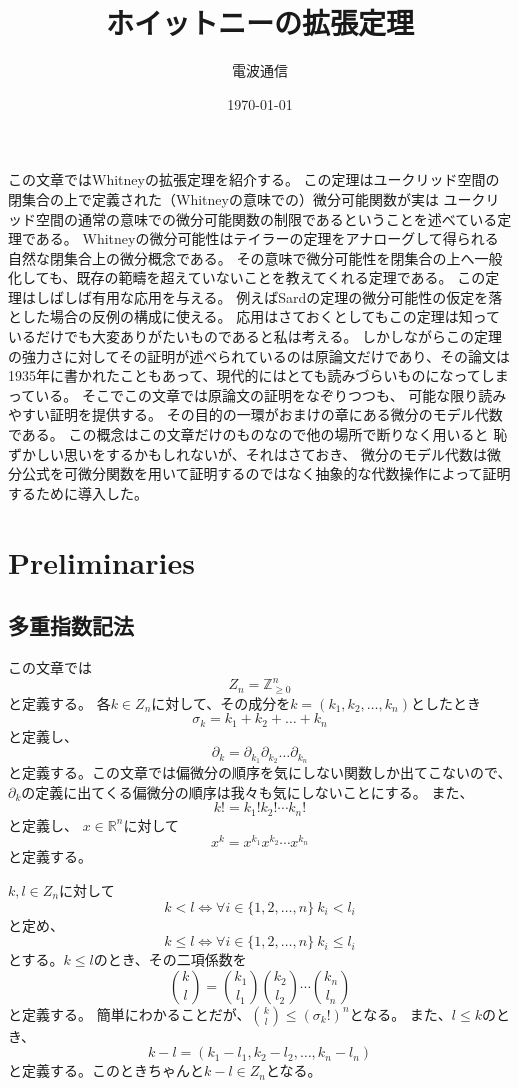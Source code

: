 \documentclass[leqno]{jsarticle}
\title{ホイットニーの拡張定理}
\author{電波通信}
\date{\today}
\newcommand{\zz}{\mathbb{Z}}
\newcommand{\rr}{\mathbb{R}}
\begin{document}
\maketitle
この文章ではWhitneyの拡張定理を紹介する。
この定理はユークリッド空間の閉集合の上で定義された（Whitneyの意味での）微分可能関数が実は
ユークリッド空間の通常の意味での微分可能関数の制限であるということを述べている定理である。
Whitneyの微分可能性はテイラーの定理をアナローグして得られる自然な閉集合上の微分概念である。
その意味で微分可能性を閉集合の上へ一般化しても、既存の範疇を超えていないことを教えてくれる定理である。
この定理はしばしば有用な応用を与える。
例えばSardの定理の微分可能性の仮定を落とした場合の反例の構成に使える。
応用はさておくとしてもこの定理は知っているだけでも大変ありがたいものであると私は考える。
しかしながらこの定理の強力さに対してその証明が述べられているのは原論文だけであり、その論文は1935年に書かれたこともあって、現代的にはとても読みづらいものになってしまっている。
そこでこの文章では原論文の証明をなぞりつつも、
可能な限り読みやすい証明を提供する。
その目的の一環がおまけの章にある微分のモデル代数である。
この概念はこの文章だけのものなので他の場所で断りなく用いると
恥ずかしい思いをするかもしれないが、それはさておき、
微分のモデル代数は微分公式を可微分関数を用いて証明するのではなく抽象的な代数操作によって証明するために導入した。
\section{Preliminaries}
\subsection{多重指数記法}
この文章では
\[
Z_n=\zz_{\ge 0}^n
\]
と定義する。
各$k\in Z_n$に対して、その成分を$k=(k_1,k_2,\dots,k_n)$としたとき
\[
\sigma_k=k_1+k_2+\dots+k_n
\]
と定義し、
\[
\partial_k=\partial_{k_1}\partial_{k_2}\dots\partial_{k_n}
\]
と定義する。この文章では偏微分の順序を気にしない関数しか出てこないので、$\partial_k$の定義に出てくる偏微分の順序は我々も気にしないことにする。
また、
\[
k!=k_1!k_2!\cdots k_n!
\]
と定義し、
$x\in \rr^n$に対して
\[
x^k=x^{k_1}x^{k_2}\cdots x^{k_n}
\]
と定義する。

$k,l\in Z_n$に対して
\[
k<l\iff \forall i\in \{1, 2, \dots, n\}\ k_i<l_i
\]
と定め、
\[
k\le l\iff \forall i\in \{1, 2, \dots, n\}\ k_i\le l_i
\]
とする。$k\le l$のとき、その二項係数を
\[
\binom{k}{l}=\binom{k_1}{l_1}\binom{k_2}{l_2}\cdots\binom{k_n}{l_n}
\]
と定義する。
簡単にわかることだが、$\binom{k}{l}\le (\sigma_k!)^n$となる。
また、$l\le k$のとき、
\[
k-l=(k_1-l_1,k_2-l_2, \dots, k_n-l_n)
\]
と定義する。このときちゃんと$k-l\in Z_n$となる。
\end{document}
